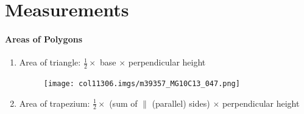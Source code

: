 \chapter{Measurements}  
%             
      
 \label{m39357*uid97}
            \subsubsection{ Areas of Polygons}
            \nopagebreak
            
          
          \label{m39357*id319719}\begin{enumerate}[noitemsep, label=\textbf{\arabic*}. ] 
            \label{m39357*uid98}\item Area of triangle: $\frac{1}{2}\ensuremath{\times}$ base \begin{math}\ensuremath{\times}\end{math} perpendicular height

    \setcounter{subfigure}{0}


	\begin{figure}[H] %
    \begin{center}
    \label{m39357*id319762!!!underscore!!!media}\label{m39357*id319762!!!underscore!!!printimage}\texttt{[image: col11306.imgs/m39357\_MG10C13\_047.png]} %
        
      \vspace{2pt}
    \vspace{.1in}
    
    \end{center}

 \end{figure}   

    \addtocounter{footnote}{-0}
    \label{m39357*uid99}\item Area of trapezium: $\frac{1}{2}\ensuremath{\times}$ (sum of \begin{math}\parallel \end{math} (parallel) sides) \begin{math}\ensuremath{\times}\end{math} perpendicular height

    \setcounter{subfigure}{0}



\end{enumerate}

